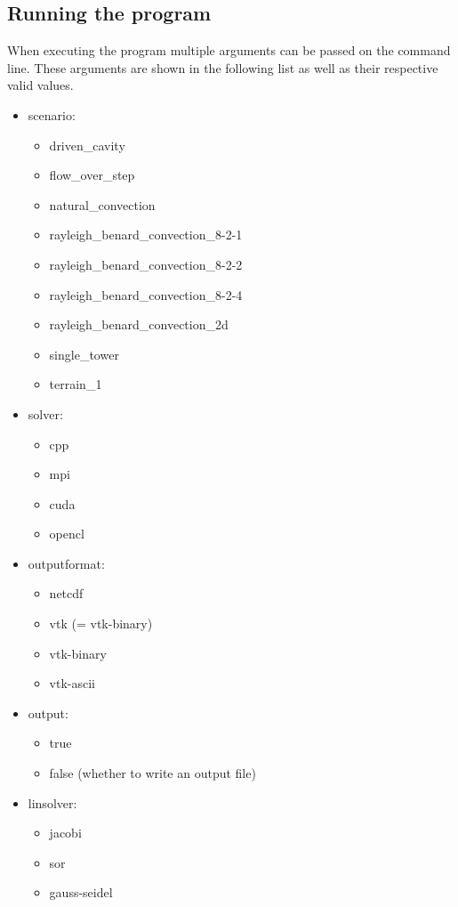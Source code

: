 \documentclass{article}%
\begin{document}
\subsection{Running the program}
When executing the program multiple arguments can be passed on the command line. These arguments are shown in the following list as well as their respective valid values.
\begin{itemize}
\item scenario:
	\begin{itemize}
	\item driven\_cavity
	\item flow\_over\_step
	\item natural\_convection
	\item rayleigh\_benard\_convection\_8-2-1
	\item rayleigh\_benard\_convection\_8-2-2
	\item rayleigh\_benard\_convection\_8-2-4
	\item rayleigh\_benard\_convection\_2d
	\item single\_tower\item terrain\_1
	\end{itemize}
\item solver:
	\begin{itemize}
	\item cpp
	\item mpi
	\item cuda
	\item opencl
	\end{itemize}
\item outputformat:
	\begin{itemize}
	\item netcdf
	\item vtk (= vtk-binary)
	\item vtk-binary
	\item vtk-ascii
	\end{itemize}
\item output:
	\begin{itemize}
	\item true
	\item false (whether to write an output file)
	\end{itemize}
\item linsolver:
	\begin{itemize}
	\item jacobi
	\item sor
	\item gauss-seidel
	\end{itemize}

\end{itemize}
\end{document}
